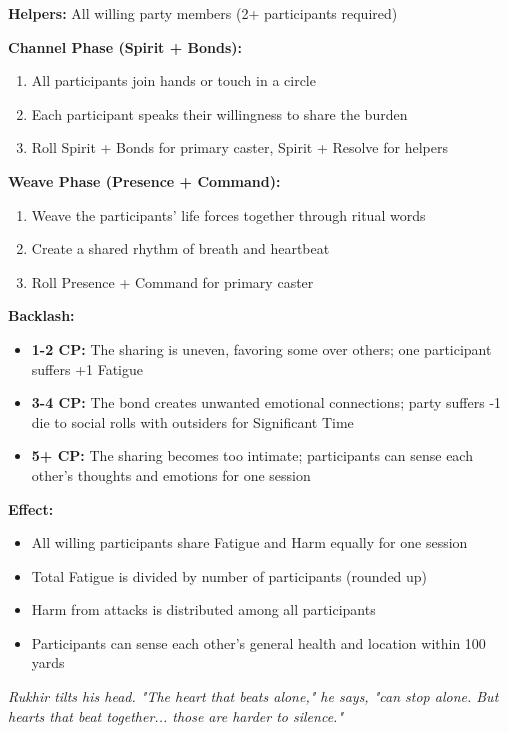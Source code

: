 \documentclass[12pt,twoside]{book}
\newcommand{\shadow}[1]{\textit{#1}}
\begin{document}
\textbf{Helpers:} All willing party members (2+ participants required)

\textbf{Channel Phase (Spirit + Bonds):}
\begin{enumerate}
\item All participants join hands or touch in a circle
\item Each participant speaks their willingness to share the burden
\item Roll Spirit + Bonds for primary caster, Spirit + Resolve for helpers
\end{enumerate}

\textbf{Weave Phase (Presence + Command):}
\begin{enumerate}
\item Weave the participants' life forces together through ritual words
\item Create a shared rhythm of breath and heartbeat
\item Roll Presence + Command for primary caster
\end{enumerate}

\textbf{Backlash:}
\begin{itemize}
\item \textbf{1-2 CP:} The sharing is uneven, favoring some over others; one participant suffers +1 Fatigue
\item \textbf{3-4 CP:} The bond creates unwanted emotional connections; party suffers -1 die to social rolls with outsiders for Significant Time
\item \textbf{5+ CP:} The sharing becomes too intimate; participants can sense each other's thoughts and emotions for one session
\end{itemize}

\textbf{Effect:}
\begin{itemize}
\item All willing participants share Fatigue and Harm equally for one session
\item Total Fatigue is divided by number of participants (rounded up)
\item Harm from attacks is distributed among all participants
\item Participants can sense each other's general health and location within 100 yards
\end{itemize}

\shadow{Rukhir tilts his head. "The heart that beats alone," he says, "can stop alone. But hearts that beat together... those are harder to silence."}
\end{document}
